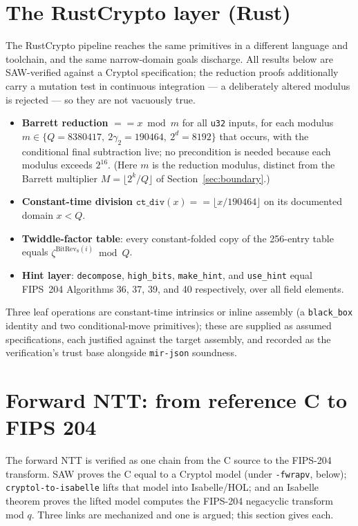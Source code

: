 \documentclass[journal=tches,submission,review]{iacrtrans}
\newcommand{\code}[1]{\texttt{#1}}
\begin{document}
\section{The RustCrypto layer (Rust)}\label{sec:rust}

The RustCrypto pipeline reaches the same primitives in a different language and toolchain, and the same
narrow-domain goals discharge. All results below are SAW-verified against a Cryptol specification; the
reduction proofs additionally carry a mutation test in continuous integration --- a deliberately altered
modulus is rejected --- so they are not vacuously true.
\begin{itemize}
  \item \textbf{Barrett reduction} $== x \bmod m$ for all \code{u32} inputs, for each modulus
  $m \in \{Q = 8380417,\ 2\gamma_2 = 190464,\ 2^d = 8192\}$ that occurs, with the conditional final
  subtraction live; no precondition is needed because each modulus exceeds $2^{16}$. (Here $m$ is the
  reduction modulus, distinct from the Barrett multiplier $M = \lfloor 2^k/Q \rfloor$ of
  Section~\ref{sec:boundary}.)
  \item \textbf{Constant-time division} $\code{ct\_div}(x) == \lfloor x / 190464 \rfloor$ on its
  documented domain $x < Q$.
  \item \textbf{Twiddle-factor table}: every constant-folded copy of the 256-entry table equals
  $\zeta^{\mathrm{BitRev}_8(i)} \bmod Q$.
  \item \textbf{Hint layer}: \code{decompose}, \code{high\_bits}, \code{make\_hint}, and
  \code{use\_hint} equal FIPS~204 Algorithms 36, 37, 39, and 40 respectively, over all field elements.
\end{itemize}
Three leaf operations are constant-time intrinsics or inline assembly (a \code{black\_box} identity and
two conditional-move primitives); these are supplied as assumed specifications, each justified against
the target assembly, and recorded as the verification's trust base alongside \code{mir-json} soundness.

\section{Forward NTT: from reference C to FIPS 204}\label{sec:fwdntt}\label{sec:ntt}

The forward NTT is verified as one chain from the C source to the FIPS-204 transform. SAW proves the C
equal to a Cryptol model (under \code{-fwrapv}, below); \code{cryptol-to-isabelle} lifts that model into
Isabelle/HOL; and an Isabelle theorem proves the lifted model computes the FIPS-204 negacyclic transform
mod $q$. Three links are mechanized and one is argued; this section gives each.
\end{document}
